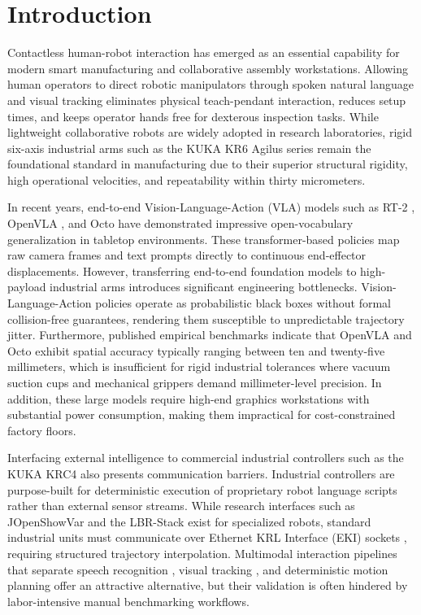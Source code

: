 \documentclass{svproc}
\begin{document}
\section{Introduction}
\label{sec:introduction}

Contactless human-robot interaction has emerged as an essential capability for modern smart manufacturing and collaborative assembly workstations. Allowing human operators to direct robotic manipulators through spoken natural language and visual tracking eliminates physical teach-pendant interaction, reduces setup times, and keeps operator hands free for dexterous inspection tasks. While lightweight collaborative robots are widely adopted in research laboratories, rigid six-axis industrial arms such as the KUKA KR6 Agilus series remain the foundational standard in manufacturing due to their superior structural rigidity, high operational velocities, and repeatability within thirty micrometers.

In recent years, end-to-end Vision-Language-Action (VLA) models such as RT-2 \cite{rt2_2023}, OpenVLA \cite{openvla2024}, and Octo \cite{octo2024} have demonstrated impressive open-vocabulary generalization in tabletop environments. These transformer-based policies map raw camera frames and text prompts directly to continuous end-effector displacements. However, transferring end-to-end foundation models to high-payload industrial arms introduces significant engineering bottlenecks. Vision-Language-Action policies operate as probabilistic black boxes without formal collision-free guarantees, rendering them susceptible to unpredictable trajectory jitter. Furthermore, published empirical benchmarks indicate that OpenVLA \cite{openvla2024} and Octo \cite{octo2024} exhibit spatial accuracy typically ranging between ten and twenty-five millimeters, which is insufficient for rigid industrial tolerances where vacuum suction cups and mechanical grippers demand millimeter-level precision. In addition, these large models require high-end graphics workstations with substantial power consumption, making them impractical for cost-constrained factory floors.

Interfacing external intelligence to commercial industrial controllers such as the KUKA KRC4 \cite{kuka_kss2018} also presents communication barriers. Industrial controllers are purpose-built for deterministic execution of proprietary robot language scripts rather than external sensor streams. While research interfaces such as JOpenShowVar \cite{jopenshowvar2015} and the LBR-Stack \cite{lbr_stack2024} exist for specialized robots, standard industrial units must communicate over Ethernet KRL Interface (EKI) sockets \cite{kuka_eki_eval2022}, requiring structured trajectory interpolation. Multimodal interaction pipelines that separate speech recognition \cite{vosk2020}, visual tracking \cite{quirubot2016,schafer2023smart}, and deterministic motion planning \cite{voice_ros2_2024,pilz_motion2021} offer an attractive alternative, but their validation is often hindered by labor-intensive manual benchmarking workflows.
\end{document}
